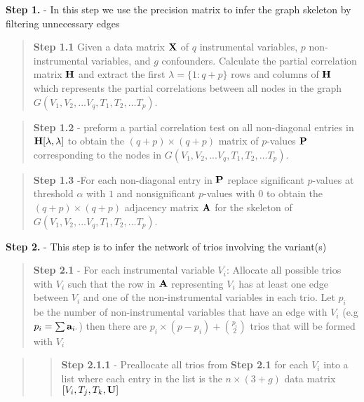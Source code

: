 \documentclass[12pt]{report}
\begin{document}
\textbf{Step 1.} - In this step we use the precision matrix to infer the graph skeleton by filtering unnecessary edges 

\begin{quote}
 \textbf{Step 1.1} Given a data matrix ${\bf X}$ of $q$ instrumental variables, $p$ non-instrumental variables, and $g$ confounders. Calculate the partial correlation matrix $\bf H$ and extract the first $\lambda = \{1 : q+p\}$ rows and columns of ${\bf H}$ which represents the partial correlations between all nodes in the graph $G(V_1, V_2,...V_q, T_1, T_2, ... T_p)$.
\end{quote}

\begin{quote}
\textbf{Step 1.2} - preform a partial correlation test on all non-diagonal entries in ${\bf H}[\lambda, \lambda]$ to obtain the $(q+p) \times (q+p)$ matrix of $p$-values ${\bf P}$ corresponding to the nodes in  $G(V_1, V_2,...V_q, T_1, T_2, ... T_p)$. 
\end{quote}

\begin{quote}
\textbf{Step 1.3} -For each non-diagonal entry in $\bf P$ replace significant $p$-values at threshold $\alpha$ with $1$ and nonsignificant $p$-values with $0$ to obtain the $(q+p) \times (q+p)$ adjacency matrix $\bf A$ for the skeleton of $G(V_1, V_2,...V_q, T_1, T_2, ... T_p)$. \\
\end{quote}

\noindent \textbf{Step 2.} - This step is to infer the network of trios involving the variant(s) 

\begin{quote}
\textbf{Step 2.1} - For each instrumental variable $V_i$: Allocate all possible trios with $V_i$ such that the row in $\bf A$ representing $V_i$ has at least one edge between $V_i$ and one of the non-instrumental variables in each trio. Let $p_i$ be the number of non-instrumental variables that have an edge with $V_i$ (e.g $p_i = \sum {\bf a}_{i\cdot}$) then there are $p_i \times (p-p_i)+{p_i\choose2}$ trios that will be formed with $V_i$  \\
\end{quote}

\begin{quote}
\begin{quote}
\textbf{Step 2.1.1} -  Preallocate all trios from \textbf{Step 2.1} for each $V_i$ into a list where each entry in the list is the $n\times(3 +g)$ data matrix $[V_i,T_j,T_k, \bf{U}]$
\end{quote}
\end{quote}
\end{document}

